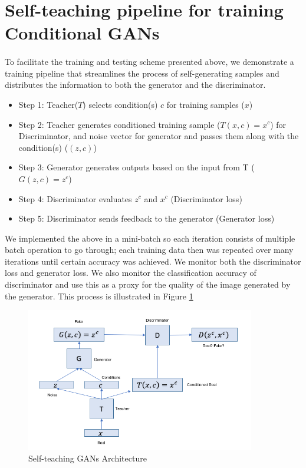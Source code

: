 \documentclass[11pt, letterpaper, oneside]{article}
\begin{document}
\section{Self-teaching pipeline for training Conditional GANs}
\paragraph{}
To facilitate the training and testing scheme presented above, we demonstrate a training pipeline that streamlines the process of self-generating samples and distributes the information to both the generator and the discriminator. 
\begin{itemize}
    \item Step 1: Teacher($T$) selects condition(s) $c$ for training samples ($x$) 
    \item Step 2: Teacher generates conditioned training sample ($T(x, c) = x^c$) for Discriminator, and noise vector for generator and passes them along with the condition(s) ($(z, c)$)
    \item Step 3: Generator generates outputs based on the input from T ($G(z, c) = z^c$)
    \item Step 4: Discriminator evaluates $z^c$ and $x^c$ (Discriminator loss)
    \item Step 5: Discriminator sends feedback to the generator (Generator loss)
\end{itemize} 
We implemented the above in a mini-batch so each iteration consists of multiple batch operation to go through; each training data then was repeated over many iterations until certain accuracy was achieved. We monitor both the discriminator loss and generator loss. We also monitor the classification accuracy of discriminator and use this as a proxy for the quality of the image generated by the generator. This process is illustrated in Figure \ref{fig:Self-teaching GANs}  

\begin{figure}[h!] \label{Teacher}
    \centering
    \includegraphics[width=10cm]{SelfTeachingGANsArchitecture.png}
    \caption{Self-teaching GANs Architecture}
    \label{fig:Self-teaching GANs}
\end{figure}
\end{document}
